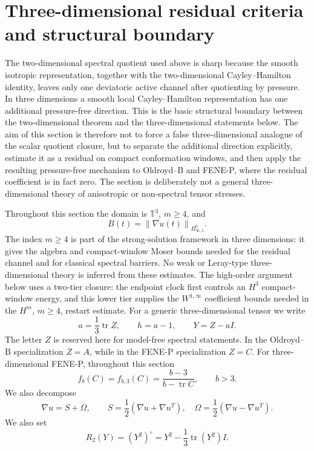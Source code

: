 \documentclass[11pt]{article}
\newcommand{\T}{\mathbb T}
\newcommand{\tr}{\operatorname{tr}}
\newcommand{\norm}[1]{\left\lVert #1\right\rVert}
\newcommand{\Besov}{B^0_{\infty,1}}
\begin{document}
\section{Three-dimensional residual criteria and structural boundary}
\label{sec:three-dimensional}

The two-dimensional spectral quotient used above is sharp because the smooth
isotropic representation, together with the two-dimensional Cayley--Hamilton
identity, leaves only one deviatoric active channel after quotienting by
pressure.  In three dimensions a smooth local Cayley--Hamilton representation
has one additional pressure-free direction.  This is the basic structural
boundary between the two-dimensional theorem and the three-dimensional
statements below.  The aim of this section is therefore not to force a false
three-dimensional analogue of the scalar quotient closure, but to separate the
additional direction explicitly, estimate it as a residual on compact
conformation windows, and then apply the resulting pressure-free mechanism to
Oldroyd--B and FENE-P, where the residual coefficient is in fact zero.  The
section is deliberately not a general three-dimensional theory of anisotropic or
non-spectral tensor stresses.

Throughout this section the domain is \(\T^3\), \(m\ge4\), and
\[
  B(t)=\norm{\nabla u(t)}_{\Besov}.
\]
The index \(m\ge4\) is part of the strong-solution framework in three dimensions:
it gives the algebra and compact-window Moser bounds needed for the residual
channel and for classical spectral barriers.  No weak or Leray-type
three-dimensional theory is inferred from these estimates.  The high-order
argument below uses a two-tier closure: the endpoint clock first controls an
\(H^3\) compact-window energy, and this lower tier supplies the
\(W^{1,\infty}\) coefficient bounds needed in the \(H^m\), \(m\ge4\), restart
estimate.
For a generic three-dimensional tensor we write
\[
  a=\frac13\tr Z,\qquad h=a-1,\qquad Y=Z-aI .
\]
The letter \(Z\) is reserved here for model-free spectral statements.  In the
Oldroyd--B specialization \(Z=A\), while in the FENE-P specialization \(Z=C\).
For three-dimensional FENE-P, throughout this section
\[
  f_b(C)=f_{b,3}(C)=\frac{b-3}{b-\tr C},\qquad b>3.
\]
We also decompose
\[
  \nabla u=S+\Omega,\qquad
  S=\frac12(\nabla u+\nabla u^T),\quad
  \Omega=\frac12(\nabla u-\nabla u^T).
\]
We also set
\[
  R_2(Y)=(Y^2)^\circ=Y^2-\frac13\tr(Y^2)I .
\]
\end{document}
